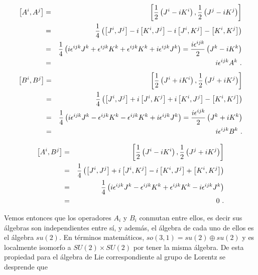 \begin{eqnarray}
\left[ A^{i},A^{j}\right]  &=&\left[ \frac{1}{2}\left( J^{i}-iK^{i}\right) ,
\frac{1}{2}\left( J^{j}-iK^{j}\right) \right]   \notag \\
&=&\frac{1}{4}\left( \left[ J^{i},J^{j}\right] -i\left[ K^{i},J^{j}\right] -i
\left[ J^{i},K^{j}\right] -\left[ K^{i},K^{j}\right] \right)   \notag \\
&=&\frac{1}{4}\left( i\epsilon ^{ijk}J^{k}+\epsilon ^{ijk}K^{k}+\epsilon
^{ijk}K^{k}+i\epsilon ^{ijk}J^{k}\right) =\frac{i\epsilon ^{ijk}}{2}\left(
J^{k}-iK^{k}\right)   \notag \\
&=&i\epsilon ^{ijk}A^{k}~.
\end{eqnarray}%
\begin{eqnarray}
\left[ B^{i},B^{j}\right]  &=&\left[ \frac{1}{2}\left( J^{i}+iK^{i}\right) ,
\frac{1}{2}\left( J^{j}+iK^{j}\right) \right]   \notag \\
&=&\frac{1}{4}\left( \left[ J^{i},J^{j}\right] +i\left[ J^{i},K^{j}\right] +i
\left[ K^{i},J^{j}\right] -\left[ K^{i},K^{j}\right] \right)   \notag \\
&=&\frac{1}{4}\left( i\epsilon ^{ijk}J^{k}-\epsilon ^{ijk}K^{k}-\epsilon
^{ijk}K^{k}+i\epsilon ^{ijk}J^{k}\right) =\frac{i\epsilon ^{ijk}}{2}\left(
J^{k}+iK^{k}\right)   \notag \\
&=&i\epsilon ^{ijk}B^{k}~.
\end{eqnarray}

\begin{eqnarray}
\left[ A^{i},B^{j}\right]  &=&\left[ \frac{1}{2}\left( J^{i}-iK^{i}\right) ,
\frac{1}{2}\left( J^{j}+iK^{j}\right) \right]   \notag \\
&=&\frac{1}{4}\left( \left[ J^{i},J^{j}\right] +i\left[ J^{i},K^{j}\right] -i
\left[ K^{i},J^{j}\right] +\left[ K^{i},K^{j}\right] \right)   \notag \\
&=&\frac{1}{4}\left( i\epsilon ^{ijk}J^{k}-\epsilon ^{ijk}K^{k}+\epsilon
^{ijk}K^{k}-i\epsilon ^{ijk}J^{k}\right)   \notag \\
&=&0~.
\end{eqnarray}

Vemos entonces que los operadores $A_{i}$ y $B_{i}$ conmutan entre ellos, es decir sus álgebras son independientes entre sí, y además, el álgebra de cada uno de ellos es el álgebra $su(2)$. En términos matemáticos, $so(3,1) = su(2) \oplus su(2)$ y es localmente isomorfo a $SU(2)\times SU(2)$ por tener la misma álgebra. De esta propiedad para el álgebra de Lie correspondiente al grupo de Lorentz se desprende que 

